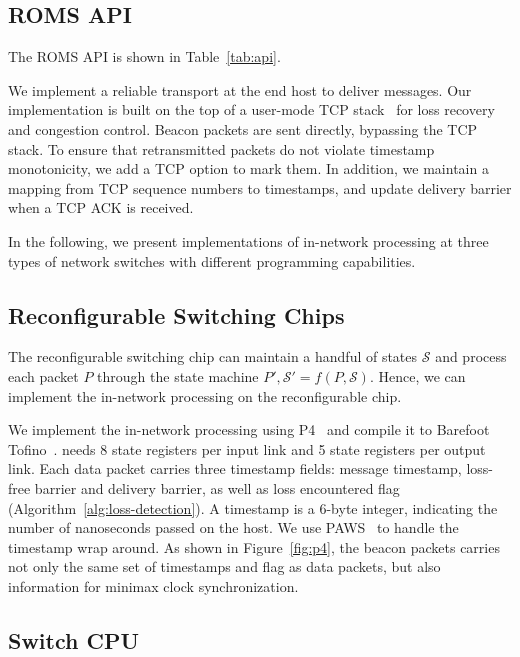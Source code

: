\subsection{ROMS API}
\label{sec:api}

The ROMS API is shown in Table~\ref{tab:api}.

We implement a reliable transport at the end host to deliver messages. Our implementation is built on the top of a user-mode TCP stack~\cite{dunkels2001design} for loss recovery and congestion control. Beacon packets are sent directly, bypassing the TCP stack. To ensure that retransmitted packets do not violate timestamp monotonicity, we add a TCP option to mark them. In addition, we maintain a mapping from TCP sequence numbers to timestamps, and update delivery barrier when a TCP ACK is received.

In the following, we present implementations of in-network processing at three types of network switches with different programming capabilities. 


\subsection{Reconfigurable Switching Chips}
\label{sec:p4}
The reconfigurable switching chip can maintain 
a handful of states $\mathcal{S}$ and process each packet $P$ through the state machine $P', \mathcal{S}' = f(P, \mathcal{S})$. Hence, we can implement the in-network processing on the reconfigurable chip. 

We implement the in-network processing using P4~\cite{bosshart2014p4} and compile it to Barefoot Tofino~\cite{tofino}. \sys needs 8 state registers per input link and 5 state registers per output link. Each data packet carries three timestamp fields: message timestamp, loss-free barrier and delivery barrier, as well as loss encountered flag (Algorithm~\ref{alg:loss-detection}).
A timestamp is a 6-byte integer, indicating the number of nanoseconds passed on the host. %
We use PAWS~\cite{jacobson1992tcp} to handle the timestamp wrap around.
As shown in Figure~\ref{fig:p4}, the beacon packets carries not only the same set of timestamps and flag as data packets, but also information for minimax clock synchronization.

\subsection{Switch CPU}
\label{sec:commodity}

